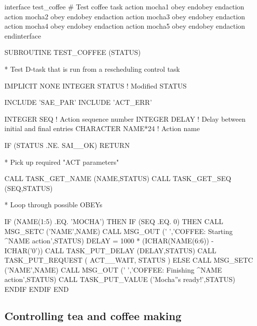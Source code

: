 \documentclass[twoside,11pt,nolof]{starlink}
\begin{document}
\begin{small}
\begin{terminalv}
interface test_coffee
#  Test coffee task
    action mocha1
        obey
        endobey
    endaction
    action mocha2
        obey
        endobey
    endaction
    action mocha3
        obey
        endobey
    endaction
    action mocha4
        obey
        endobey
    endaction
    action mocha5
        obey
        endobey
    endaction
endinterface

      SUBROUTINE TEST_COFFEE (STATUS)

*     Test D-task that is run from a rescheduling control task

      IMPLICIT NONE
      INTEGER   STATUS          ! Modified STATUS

      INCLUDE   'SAE_PAR'
      INCLUDE   'ACT_ERR'

      INTEGER   SEQ             ! Action sequence number
      INTEGER   DELAY           ! Delay between initial and final entries
      CHARACTER NAME*24         ! Action name

      IF (STATUS .NE. SAI__OK) RETURN

*  Pick up required "ACT parameters"

      CALL TASK_GET_NAME (NAME,STATUS)
      CALL TASK_GET_SEQ (SEQ,STATUS)

*  Loop through possible OBEYs

      IF (NAME(1:5) .EQ. 'MOCHA') THEN
         IF (SEQ .EQ. 0) THEN
            CALL MSG_SETC ('NAME',NAME)
            CALL MSG_OUT (' ','COFFEE: Starting ^NAME action',STATUS)
            DELAY = 1000 * (ICHAR(NAME(6:6)) - ICHAR('0'))
            CALL TASK_PUT_DELAY (DELAY,STATUS)
            CALL TASK_PUT_REQUEST ( ACT__WAIT, STATUS )
         ELSE
            CALL MSG_SETC ('NAME',NAME)
            CALL MSG_OUT (' ','COFFEE: Finishing ^NAME action',STATUS)
            CALL TASK_PUT_VALUE ('Mocha''s ready!',STATUS)
         ENDIF
      ENDIF
      END

\end{terminalv}
\end{small}

\subsection{Controlling tea and coffee making}
\end{document}

